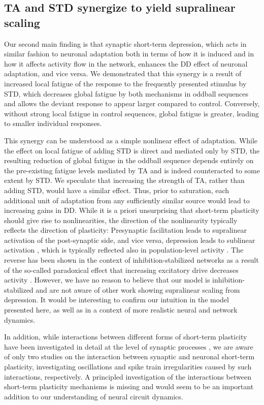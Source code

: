 \documentclass[10pt,letterpaper]{article}
\begin{document}
\subsection*{TA and STD synergize to yield supralinear scaling}

Our second main finding is that synaptic short-term depression, which acts in similar fashion to neuronal adaptation both in terms of how it is induced and in how it affects activity flow in the network, enhances the DD effect of neuronal adaptation, and vice versa. We demonstrated that this synergy is a result of increased local fatigue of the response to the frequently presented stimulus by STD, which decreases global fatigue by both mechanisms in oddball sequences and allows the deviant response to appear larger compared to control. Conversely, without strong local fatigue in control sequences, global fatigue is greater, leading to smaller individual responses.

This synergy can be understood as a simple nonlinear effect of adaptation. While the effect on local fatigue of adding STD is direct and mediated only by STD, the resulting reduction of global fatigue in the oddball sequence depends entirely on the pre-existing fatigue levels mediated by TA and is indeed counteracted to some extent by STD. We speculate that increasing the strength of TA, rather than adding STD, would have a similar effect. Thus, prior to saturation, each additional unit of adaptation from any sufficiently similar source would lead to increasing gains in DD. While it is a priori unsurprising that short-term plasticity should give rise to nonlinearities, the direction of the nonlinearity typically reflects the direction of plasticity: Presynaptic facilitation leads to supralinear activation of the post-synaptic side, and vice versa, depression leads to sublinear activation \cite{Tsodyks1997-qt, Varela1997-nr}, which is typically reflected also in population-level activity \cite{Tsodyks1998-bq}. The reverse has been shown in the context of inhibition-stabilized networks \cite{Wu2023-aa} as a result of the so-called paradoxical effect that increasing excitatory drive decreases activity \cite{Tsodyks1997-hr, Sanzeni2020-su}. However, we have no reason to believe that our model is inhibition-stabilized and are not aware of other work showing supralinear scaling from depression. It would be interesting to confirm our intuition in the model presented here, as well as in a context of more realistic neural and network dynamics.

In addition, while interactions between different forms of short-term plasticity have been investigated in detail at the level of synaptic processes \cite{Tsodyks1997-qt, Varela1997-nr, Buonomano1998-hf, Hennig2008-sc, Anwar2017-qg, Mondal2022-av}, we are aware of only two studies on the interaction between synaptic and neuronal short-term plasticity, investigating oscillations \cite{Mejias2011-rv} and spike train irregularities \cite{Ileri2015-eu} caused by such interactions, respectively. A principled investigation of the interactions between short-term plasticity mechanisms is missing and would seem to be an important addition to our understanding of neural circuit dynamics.
\end{document}
